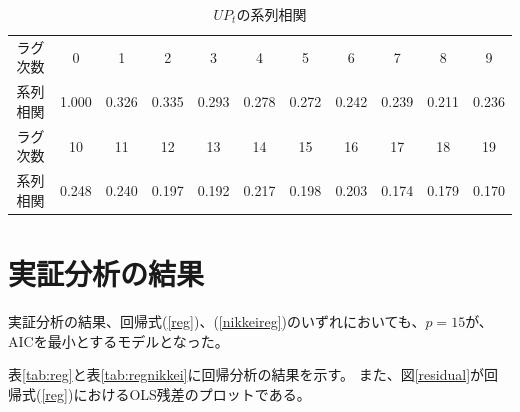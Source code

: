 \documentclass{jsarticle}
\begin{document}
\begin{table}[t]
  \begin{center}
  \caption{$UP_t$の系列相関}
\begin{tabular}{c|cccccccccc}
\hline
ラグ次数 & 0 & 1 & 2 & 3 & 4 & 5 & 6 & 7 & 8 & 9\\
系列相関 &1.000 & 0.326 & 0.335 & 0.293 & 0.278 & 0.272 & 0.242 & 0.239 & 0.211 & 0.236 \\
\hline \hline
ラグ次数 & 10 & 11 & 12 & 13 & 14 & 15 & 16 & 17 & 18 & 19 \\
系列相関 &0.248 & 0.240 & 0.197 & 0.192 & 0.217 & 0.198 & 0.203 & 0.174 & 0.179 & 0.170 \\
\hline
	\end{tabular}
	\label{autocorr} 
  \end{center}
\end{table}


\section{実証分析の結果}
実証分析の結果、回帰式(\ref{reg})、(\ref{nikkeireg})のいずれにおいても、$p = 15$が、AICを最小とするモデルとなった。\\ \par
表\ref{tab:reg}と表\ref{tab:regnikkei}に回帰分析の結果を示す。
また、図\ref{residual}が回帰式(\ref{reg})におけるOLS残差のプロットである。
\newpage
\end{document}
